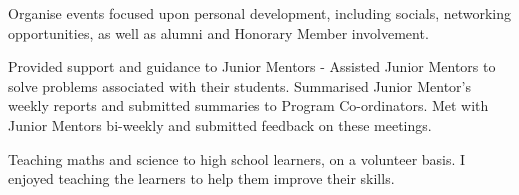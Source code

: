 \documentclass[]{deedy-resume-openfont}
\begin{document}
\begin{minipage}[t]{0.66\textwidth}
Organise events focused upon personal development, including socials, networking opportunities, as well as alumni and Honorary Member involvement. 
\sectionsep

Provided support and guidance to Junior Mentors - Assisted Junior Mentors to solve problems associated with their students. Summarised Junior Mentor’s weekly reports and submitted summaries to Program Co-ordinators. Met with Junior Mentors bi-weekly and submitted feedback on these meetings.
\sectionsep

Teaching maths and science to high school learners, on a volunteer basis. I enjoyed teaching the learners to help them improve their skills.
\sectionsep

\end{minipage} 
\end{document}
